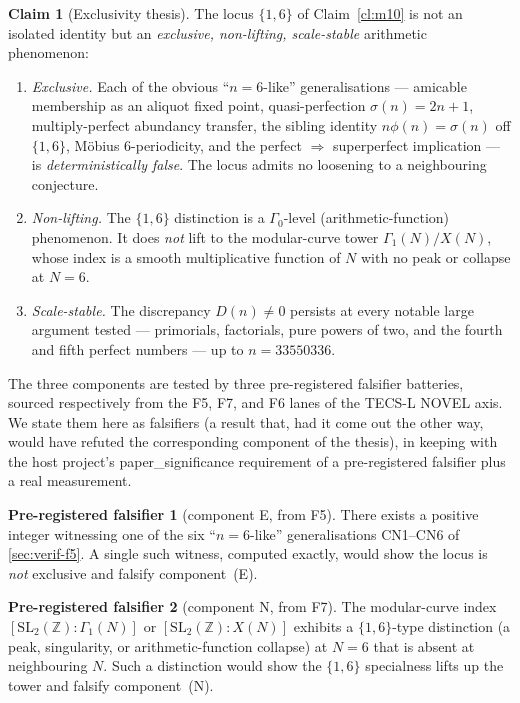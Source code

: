 \documentclass[11pt,a4paper]{article}
\newcommand{\sig}{\sigma}
\newcommand{\Dn}{D(n)}
\theoremstyle{definition}
\newtheorem{claim}{Claim}
\newtheorem{falsifier}{Pre-registered falsifier}
\begin{document}
\begin{claim}[Exclusivity thesis]\label{cl:thesis}
The locus $\{1,6\}$ of Claim~\ref{cl:m10} is not an isolated identity but an
\emph{exclusive, non-lifting, scale-stable} arithmetic phenomenon:
\begin{enumerate}
\item[\textbf{(E)}] \emph{Exclusive.} Each of the obvious ``$n=6$-like''
  generalisations --- amicable membership as an aliquot fixed point,
  quasi-perfection $\sig(n)=2n+1$, multiply-perfect abundancy transfer, the
  sibling identity $n\phi(n)=\sig(n)$ off $\{1,6\}$, M\"obius $6$-periodicity,
  and the perfect $\Rightarrow$ superperfect implication --- is
  \emph{deterministically false}. The locus admits no loosening to a
  neighbouring conjecture.
\item[\textbf{(N)}] \emph{Non-lifting.} The $\{1,6\}$ distinction is a
  $\Gamma_0$-level (arithmetic-function) phenomenon. It does \emph{not} lift to
  the modular-curve tower $\Gamma_1(N)/X(N)$, whose index is a smooth
  multiplicative function of $N$ with no peak or collapse at $N=6$.
\item[\textbf{(S)}] \emph{Scale-stable.} The discrepancy $\Dn\neq0$ persists at
  every notable large argument tested --- primorials, factorials, pure powers
  of two, and the fourth and fifth perfect numbers --- up to
  $n=33550336$.
\end{enumerate}
\end{claim}

The three components are tested by three pre-registered falsifier batteries,
sourced respectively from the F5, F7, and F6 lanes of the TECS-L NOVEL axis.
We state them here as falsifiers (a result that, had it come out the other
way, would have refuted the corresponding component of the thesis), in keeping
with the host project's \textsf{paper\_significance} requirement of a
pre-registered falsifier plus a real measurement.

\begin{falsifier}[component E, from F5]\label{f:E}
There exists a positive integer witnessing one of the six ``$n=6$-like''
generalisations CN1--CN6 of \textsection\ref{sec:verif-f5}. A single such
witness, computed exactly, would show the locus is \emph{not} exclusive and
falsify component~(E).
\end{falsifier}

\begin{falsifier}[component N, from F7]\label{f:N}
The modular-curve index $[\mathrm{SL}_2(\mathbb{Z}):\Gamma_1(N)]$ or
$[\mathrm{SL}_2(\mathbb{Z}):X(N)]$ exhibits a $\{1,6\}$-type distinction
(a peak, singularity, or arithmetic-function collapse) at $N=6$ that is absent
at neighbouring $N$. Such a distinction would show the $\{1,6\}$ specialness
lifts up the tower and falsify component~(N).
\end{falsifier}
\end{document}
